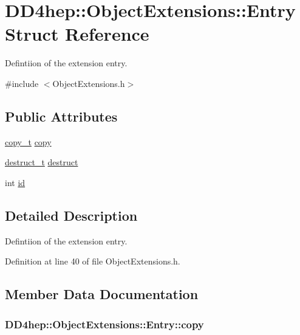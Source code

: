 \hypertarget{struct_d_d4hep_1_1_object_extensions_1_1_entry}{
\section{DD4hep::ObjectExtensions::Entry Struct Reference}
\label{struct_d_d4hep_1_1_object_extensions_1_1_entry}
}


Defintiion of the extension entry.  


{\ttfamily \#include $<$ObjectExtensions.h$>$}\subsection*{Public Attributes}
\begin{DoxyCompactItemize}
\item 
\hyperlink{class_d_d4hep_1_1_object_extensions_ab58b60490186d1adc0c5585ad691a7c2}{copy\_\-t} \hyperlink{struct_d_d4hep_1_1_object_extensions_1_1_entry_a97a6e0981c8602449ecd304376740cc5}{copy}
\item 
\hyperlink{class_d_d4hep_1_1_object_extensions_af9ca2813f0d7fa65ac13d905d9721cdf}{destruct\_\-t} \hyperlink{struct_d_d4hep_1_1_object_extensions_1_1_entry_a4a7454a4a71075f91c6c260025eaf89c}{destruct}
\item 
int \hyperlink{struct_d_d4hep_1_1_object_extensions_1_1_entry_a96f2362da856b43495f39a9d0ef48c0f}{id}
\end{DoxyCompactItemize}


\subsection{Detailed Description}
Defintiion of the extension entry. 

Definition at line 40 of file ObjectExtensions.h.

\subsection{Member Data Documentation}
\hypertarget{struct_d_d4hep_1_1_object_extensions_1_1_entry_a97a6e0981c8602449ecd304376740cc5}{
\subsubsection[{copy}]{ {\bf DD4hep::ObjectExtensions::Entry::copy}}}
\label{struct_d_d4hep_1_1_object_extensions_1_1_entry_a97a6e0981c8602449ecd304376740cc5}



